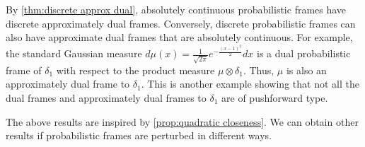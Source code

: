 \documentclass{amsart}
\numberwithin{equation}{section}
\theoremstyle{plain}
\theoremstyle{remark}
\theoremstyle{definition}
\begin{document}
By \cref{thm:discrete approx dual}, absolutely continuous probabilistic frames have discrete approximately dual frames. Conversely, discrete probabilistic frames can also have approximate dual frames that are absolutely continuous. For example,  the standard Gaussian measure $d\mu(x) = \frac{1}{\sqrt{2\pi}} e^{-\frac{(x-1)^2}{2}}dx$ is a dual probabilistic frame of $\delta_1$ with respect to the product measure $\mu \otimes \delta_1$. Thus, $\mu$ is also an approximately dual frame to $\delta_1$. This is another example showing that not all the dual frames and approximately dual frames to $\delta_1$ are of pushforward type. 

The above results are inspired by \cref{prop:quadratic closeness}. We can obtain other results if probabilistic frames are perturbed in different ways.
\end{document}
